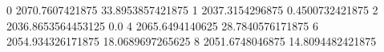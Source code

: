 0 2070.7607421875 33.8953857421875
1 2037.3154296875 0.4500732421875
2 2036.8653564453125 0.0
4 2065.6494140625 28.7840576171875
6 2054.934326171875 18.0689697265625
8 2051.6748046875 14.8094482421875
